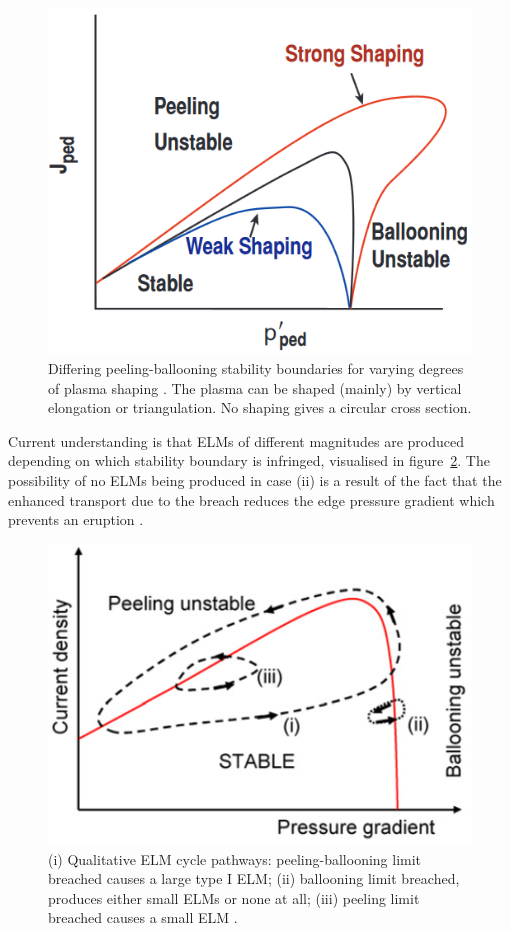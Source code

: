 \documentclass[11pt, twocolumn]{article}  %
\begin{document}
\begin{figure}
\includegraphics[scale=0.6]{Figures/PBshaping.PNG}
\centering
\caption{Differing peeling-ballooning stability boundaries for varying degrees of plasma shaping \cite{Snyder2004}. The plasma can be shaped (mainly) by vertical elongation or triangulation. No shaping gives a circular cross section.}\label{fig:PBshaping}
\end{figure}

Current understanding is that ELMs of different magnitudes are produced depending on which stability boundary is infringed, visualised in figure~\ref{fig:ELMcycles}. The possibility of no ELMs being produced in case (ii) is a result of the fact that the enhanced transport due to the breach reduces the edge pressure gradient which prevents an eruption \cite{Wilson2006}.

\begin{figure}
\includegraphics[scale=0.6]{Figures/ELMcycles.PNG}
\centering
\caption{(i) Qualitative ELM cycle pathways: peeling-ballooning limit breached causes a large type I ELM; (ii) ballooning limit breached, produces either small ELMs or none at all; (iii) peeling limit breached causes a small ELM \cite{Wilson2006}.}\label{fig:ELMcycles}
\end{figure}
\end{document}
